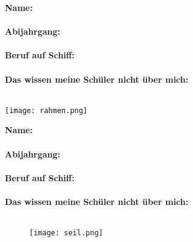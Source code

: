 \begin{minipage}[t][0.28\textheight][t]{\linewidth}
    \ifodd\profnum
	\begin{minipage}[c]{0.79\textwidth}
		\textbf{Name:}\\ \profname\\
		\textbf{Abijahrgang:}\\ \profabi\\
		\textbf{Beruf auf Schiff:}\\ \profprof\\
		\textbf{Das wissen meine Schüler nicht über mich:}\\ \profsecret\\
	\end{minipage}
    \fi
	\begin{minipage}[c]{0.2\textwidth}
		\texttt{[image: rahmen.png]}
	\end{minipage}
    \ifodd\profnum\else
    \hspace*{.5cm}%
	\begin{minipage}[c]{0.79\textwidth}
		\textbf{Name:}\\ \profname\\
		\textbf{Abijahrgang:}\\ \profabi\\
		\textbf{Beruf auf Schiff:}\\ \profprof\\
		\textbf{Das wissen meine Schüler nicht über mich:}\\ \profsecret\\
	\end{minipage}
    \fi

\end{minipage}

\ifnum{}
\begin{figure}[H]
	\hspace*{-1.5cm}\texttt{[image: seil.png]}
\end{figure}
\fi
